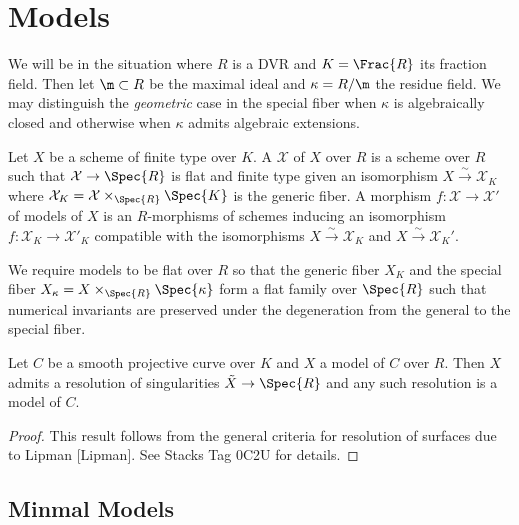 \newcommand{\X}{\mathcal{X}}

\section{Models}

\begin{rmk}
We will be in the situation where $R$ is a DVR and $K = \Frac{R}$ its fraction field. Then let $\m \subset R$ be the maximal ideal and $\kappa = R / \m$ the residue field. We may distinguish the \textit{geometric} case in the special fiber when $\kappa$ is algebraically closed and otherwise when $\kappa$ admits algebraic extensions. 
\end{rmk}

\begin{defn}
Let $X$ be a scheme of finite type over $K$. A  $\X$ of $X$ over $R$ is a scheme over $R$ such that $\X \to \Spec{R}$ is flat and finite type given an isomorphism $X \xrightarrow{\sim} \X_K$ where $\X_K = \X \times_{\Spec{R}} \Spec{K}$ is the generic fiber. A morphism $f : \X \to \X'$ of models of $X$ is an $R$-morphisms of schemes inducing an isomorphism $f : \X_K \to \X'_K$ compatible with the isomorphisms $X \xrightarrow{\sim} \X_K$ and $X \xrightarrow{\sim} \X_K'$.
\end{defn}

\begin{rmk}
We require models to be flat over $R$ so that the generic fiber $X_K$ and the special fiber $X_\kappa = X \times_{\Spec{R}} \Spec{\kappa}$ form a flat family over $\Spec{R}$ such that numerical invariants are preserved under the degeneration from the general to the special fiber.
\end{rmk}

\begin{prop} \label{resolution_of_models}
Let $C$ be a smooth projective curve over $K$ and $X$ a model of $C$ over $R$. Then $X$ admits a resolution of singularities $\tilde{X} \to \Spec{R}$ and any such resolution is a model of $C$.
\end{prop}

\begin{proof}
This result follows from the general criteria for resolution of surfaces due to Lipman [Lipman]. See Stacks Tag 0C2U for details.
\end{proof}

\subsection{Minmal Models} 

